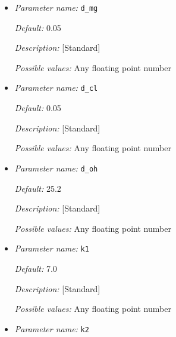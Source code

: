 \begin{itemize}

{\it Default:} 1.0

{\it Description:} [Advanced] 

{\it Possible values:} Any floating point number


\item {\it Parameter name:} {\tt d\_mg}
\label{parameters:d_mg}


{\it Default:} 0.05

{\it Description:} [Standard] 

{\it Possible values:} Any floating point number


\item {\it Parameter name:} {\tt d\_cl}
\label{parameters:d_cl}


{\it Default:} 0.05

{\it Description:} [Standard] 

{\it Possible values:} Any floating point number


\item {\it Parameter name:} {\tt d\_oh}
\label{parameters:d_oh}


{\it Default:} 25.2

{\it Description:} [Standard] 

{\it Possible values:} Any floating point number


\item {\it Parameter name:} {\tt k1}
\label{parameters:k1}


{\it Default:} 7.0

{\it Description:} [Standard] 

{\it Possible values:} Any floating point number


\item {\it Parameter name:} {\tt k2}
\label{parameters:k2}



\end{itemize}
